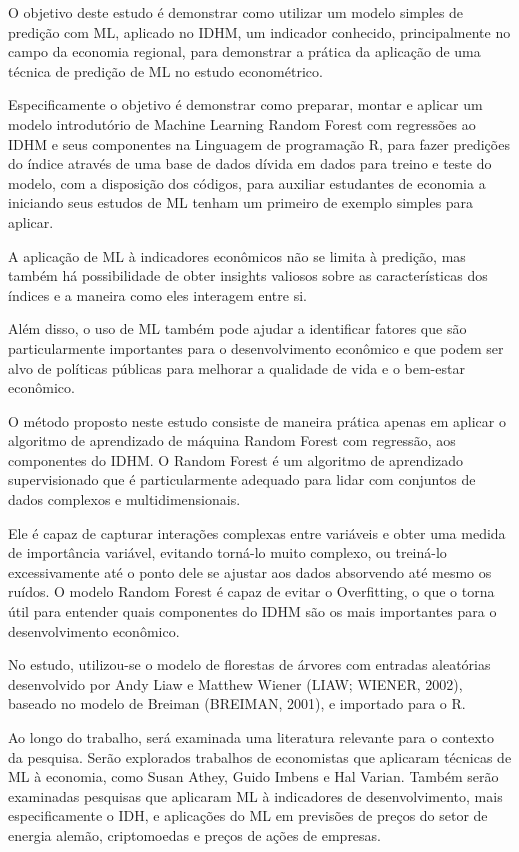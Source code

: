 \documentclass[
]{article}
\begin{document}
O objetivo deste estudo é demonstrar como utilizar um modelo simples de
predição com ML, aplicado no IDHM, um indicador conhecido,
principalmente no campo da economia regional, para demonstrar a prática
da aplicação de uma técnica de predição de ML no estudo econométrico.

Especificamente o objetivo é demonstrar como preparar, montar e aplicar
um modelo introdutório de Machine Learning Random Forest com regressões
ao IDHM e seus componentes na Linguagem de programação R, para fazer
predições do índice através de uma base de dados dívida em dados para
treino e teste do modelo, com a disposição dos códigos, para auxiliar
estudantes de economia a iniciando seus estudos de ML tenham um primeiro
de exemplo simples para aplicar.

A aplicação de ML à indicadores econômicos não se limita à predição, mas
também há possibilidade de obter insights valiosos sobre as
características dos índices e a maneira como eles interagem entre si.

Além disso, o uso de ML também pode ajudar a identificar fatores que são
particularmente importantes para o desenvolvimento econômico e que podem
ser alvo de políticas públicas para melhorar a qualidade de vida e o
bem-estar econômico.

O método proposto neste estudo consiste de maneira prática apenas em
aplicar o algoritmo de aprendizado de máquina Random Forest com
regressão, aos componentes do IDHM. O Random Forest é um algoritmo de
aprendizado supervisionado que é particularmente adequado para lidar com
conjuntos de dados complexos e multidimensionais.

Ele é capaz de capturar interações complexas entre variáveis e obter uma
medida de importância variável, evitando torná-lo muito complexo, ou
treiná-lo excessivamente até o ponto dele se ajustar aos dados
absorvendo até mesmo os ruídos. O modelo Random Forest é capaz de evitar
o Overfitting, o que o torna útil para entender quais componentes do
IDHM são os mais importantes para o desenvolvimento econômico.

No estudo, utilizou-se o modelo de florestas de árvores com entradas
aleatórias desenvolvido por Andy Liaw e Matthew Wiener (LIAW; WIENER,
2002), baseado no modelo de Breiman (BREIMAN, 2001), e importado para o
R.

Ao longo do trabalho, será examinada uma literatura relevante para o
contexto da pesquisa. Serão explorados trabalhos de economistas que
aplicaram técnicas de ML à economia, como Susan Athey, Guido Imbens e
Hal Varian. Também serão examinadas pesquisas que aplicaram ML à
indicadores de desenvolvimento, mais especificamente o IDH, e aplicações
do ML em previsões de preços do setor de energia alemão, criptomoedas e
preços de ações de empresas.
\end{document}
